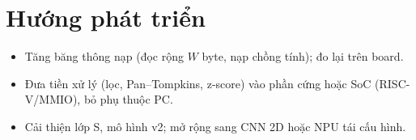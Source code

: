 \section{Hướng phát triển}\label{sec:huongphattrien}
\begin{goiy}
  \begin{itemize}
    \item Tăng băng thông nạp (đọc rộng $W$ byte, nạp chồng tính); đo lại trên board.
    \item Đưa tiền xử lý (lọc, Pan--Tompkins, z-score) vào phần cứng hoặc SoC (RISC-V/MMIO), bỏ phụ thuộc PC.
    \item Cải thiện lớp S, mô hình v2; mở rộng sang CNN 2D hoặc NPU tái cấu hình.
  \end{itemize}
\end{goiy}

